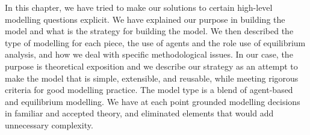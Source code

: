 In this chapter, we have tried to make our solutions to certain high-level modelling questions explicit. We have explained our purpose in building the model and what is the strategy for building the model. We then described the type of modelling for each piece, the use of agents and the role use of equilibrium analysis, and how we deal with specific methodological issues. In our case, the purpose is \gls{theoretical exposition} and we describe our strategy as an attempt to make the model that is simple, extensible, and reusable, while meeting rigorous criteria for good modelling practice. The model type is a blend of agent-based and equilibrium modelling. %
We have at each point grounded modelling decisions in familiar and accepted theory, and eliminated elements that would add unnecessary complexity. 
